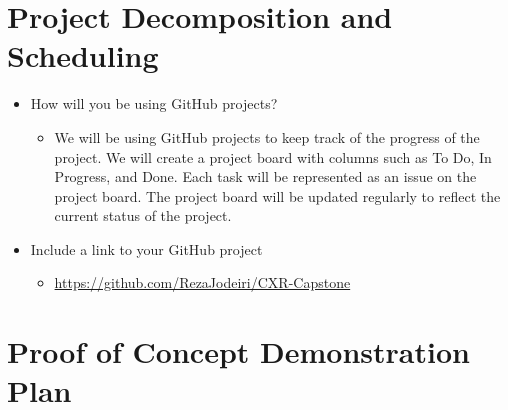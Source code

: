 \documentclass{article}
\begin{document}
\section{Project Decomposition and Scheduling}


\begin{itemize}
    \item How will you be using GitHub projects? 
    
    \begin{itemize}
        \item We will be using GitHub projects to keep track of the progress of the project. We will create a project board with columns such as To Do, In Progress, and Done. Each task will be represented as an issue on the project board. The project board will be updated regularly to reflect the current status of the project.
    \end{itemize}
    \item Include a link to your GitHub project 
    \begin{itemize}
        \item \url{https://github.com/RezaJodeiri/CXR-Capstone}
    \end{itemize}
\end{itemize}



\section{Proof of Concept Demonstration Plan}
\newpage
\end{document}
